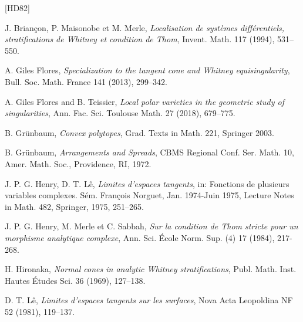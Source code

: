 \documentclass[12pt]{amsart}
\theoremstyle{definition}
\numberwithin{equation}{section}
\begin{document}
\begin{thebibliography}{[HD82]}




\normalsize
\baselineskip=17pt



J. Brian\c{c}on,  P. Maisonobe et M. Merle,  \emph{Localisation de 
syst\`emes diff\'erentiels, stratifications de Whitney et condition de Thom},   Invent. Math.  117 (1994),  531--550.

 A. Giles Flores, \emph{Specialization to the tangent cone and Whitney equisingularity}, Bull. Soc. Math. France  141 (2013),  299--342.

 A. Giles Flores and B. Teissier, \emph{Local polar varieties in the geometric study of singularities}, Ann. Fac. Sci. Toulouse Math.  27 (2018),  679--775.

 B. Grünbaum, \emph{Convex polytopes}, Grad. Texts in Math. 221, Springer 2003.

 B. Grünbaum, \emph{Arrangements and Spreads}, CBMS Regional Conf. Ser. Math. 10, Amer. Math. Soc., Providence, RI, 1972.

 J. P. G. Henry, D. T. Lê, \emph{Limites d'espaces tangents}, in: Fonctions de plusieurs variables complexes. Sém. Fran{\c c}ois Norguet, Jan. 1974-Juin 1975, Lecture Notes in Math. 482, Springer, 1975, 251--265.

   J. P. G. Henry, M. Merle et C. Sabbah, \emph{ Sur la condition de Thom stricte pour un morphisme analytique complexe},  Ann. Sci. \'Ecole Norm. Sup. (4) {17} (1984), 217-268.

 H. Hironaka, \emph{Normal cones in analytic Whitney stratifications}, Publ. Math. Inst. Hautes Études Sci. 36 (1969), 127--138.

 D. T. L{\^e},  \emph{Limites d'espaces tangents sur les surfaces}, Nova Acta Leopoldina NF 52  (1981), 119--137.


\end{thebibliography}
\end{document}

